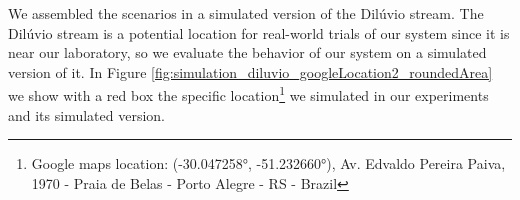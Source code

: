     We assembled the scenarios in a simulated version of the Dilúvio stream. The Dilúvio stream is a potential location for real-world trials of our system since it is near our laboratory, so we evaluate the behavior of our system on a simulated version of it. In Figure \ref{fig:simulation_diluvio_googleLocation2_roundedArea} we show with a red box the specific location\footnote{Google maps location: (-30.047258°, -51.232660°), Av. Edvaldo Pereira Paiva, 1970 - Praia de Belas - Porto Alegre - RS - Brazil} we simulated in our experiments and its simulated version.
     
